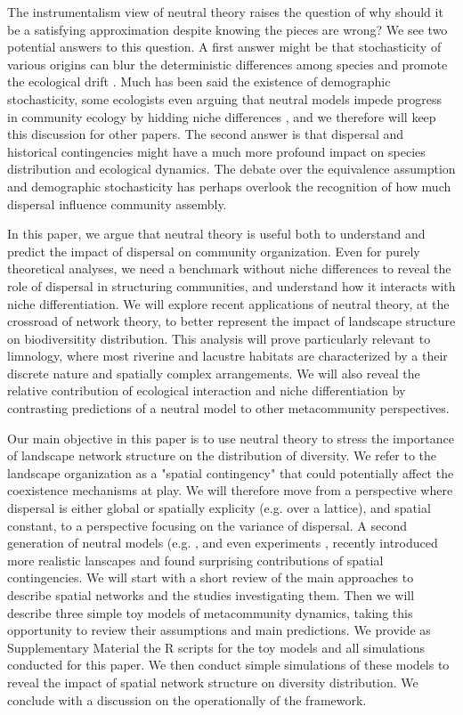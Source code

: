 \documentclass[12pt]{article}
\begin{document}
The instrumentalism view of neutral theory raises the question of why should it
be a satisfying approximation despite knowing the pieces are wrong? We see two
potential answers to this question. A first answer might be that stochasticity
of various origins can blur the deterministic differences among species and
promote the ecological drift \parencite{Gravel2011}. Much has been said the
existence of demographic stochasticity, some ecologists even arguing that
neutral models impede progress in community ecology by hidding niche differences
\parencite{Clark2012}, and we therefore will keep this discussion for other
papers. The second answer is that dispersal and historical contingencies might
have a much more profound impact on species distribution \parencite{Bahn2007}
and ecological dynamics. The debate over the equivalence assumption and
demographic stochasticity has perhaps overlook the recognition of how much
dispersal influence community assembly.

In this paper, we argue that neutral theory is useful both to understand and
predict the impact of dispersal on community organization. Even
for purely theoretical analyses, we need a benchmark without niche differences to
reveal the role of dispersal in structuring communities, and understand how it
interacts with niche differentiation. We will explore recent applications of
neutral theory, at the crossroad of network theory, to better represent the
impact of landscape structure on biodiversitity distribution. This analysis will
prove particularly relevant to limnology, where most riverine and lacustre
habitats are characterized by a their discrete nature and spatially complex
arrangements. We will also reveal the relative contribution of ecological
interaction and niche differentiation by contrasting predictions of a neutral
model to other metacommunity perspectives. 

Our main objective in this paper is to use neutral theory to stress the
importance of landscape network structure on the distribution of diversity. We
refer to the landscape organization as a "spatial contingency"
\parencite{Peres-Neto2013} that could potentially affect the coexistence
mechanisms at play. We will therefore move from a perspective where dispersal is
either global or spatially explicity (e.g. over a lattice), and spatial
constant, to a perspective focusing on the variance of dispersal. A second
generation of neutral models (e.g. \textcite{Economo2008,
Economo2011,Desjardins2012a,Desjardins2012b}, and even experiments
\parencite{Altermat2012}, recently introduced more realistic lanscapes and found
surprising contributions of spatial contingencies. We will start with a short
review of the main approaches to describe spatial networks and the studies
investigating them. Then we will describe three simple toy models of
metacommunity dynamics, taking this opportunity to review their assumptions and
main predictions. We provide as Supplementary Material the R scripts for the toy
models and all simulations conducted for this paper. We then conduct simple
simulations of these models to reveal the impact of spatial network structure on
diversity distribution. We conclude with a discussion on the operationally of
the framework.
\end{document}
